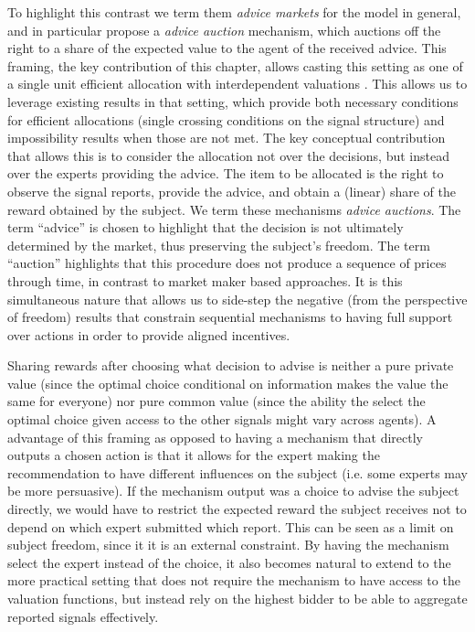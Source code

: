 To highlight this contrast we term them \emph{advice markets} for the model in general, and in particular propose a \emph{advice auction} mechanism, which auctions off the right to a share of the expected value to the agent of the received advice. This framing, the key contribution of this chapter, allows casting this setting as one of a single unit efficient allocation with interdependent valuations \citep{milgrom1982theory,maskin1992auctions,ausubel1999generalized,mclean2004informational,roughgarden2016optimal,eden2018interdependent}.
This allows us to leverage existing results in that setting, which provide both necessary conditions for efficient allocations (single crossing conditions on the signal structure) and impossibility results when those are not met.
The key conceptual contribution that allows this is to consider the allocation not over the decisions, but instead over the experts providing the advice. 
The item to be allocated is the right to observe the signal reports, provide the advice, and obtain a (linear) share of the reward obtained by the subject.
We term these mechanisms \emph{advice auctions}.
The term ``advice'' is chosen to highlight that the decision is not ultimately determined by the market, thus preserving the subject's freedom.
The term ``auction'' highlights that this procedure does not produce a sequence of prices through time, in contrast to market maker based approaches.
It is this simultaneous nature that allows us to side-step the negative (from the perspective of freedom) results that constrain sequential mechanisms to having full support over actions in order to provide aligned incentives.

Sharing rewards after choosing what decision to advise is neither a pure private value (since the optimal choice conditional on information makes the value the same for everyone) nor pure common value (since the ability the select the optimal choice given access to the other signals might vary across agents).
A advantage of this framing as opposed to having a mechanism that directly outputs a chosen action is that it allows for the expert making the recommendation to have different influences on the subject (i.e. some experts may be more persuasive).
If the mechanism output was a choice to advise the subject directly, we would have to restrict the expected reward the subject receives not to depend on which expert submitted which report. This can be seen as  a limit on subject freedom, since it it is an external constraint.
By having the mechanism select the expert instead of the choice, it also becomes natural to extend to the more practical setting that does not require the mechanism to have access to the valuation functions, but instead rely on the highest bidder to be able to aggregate reported signals effectively.

